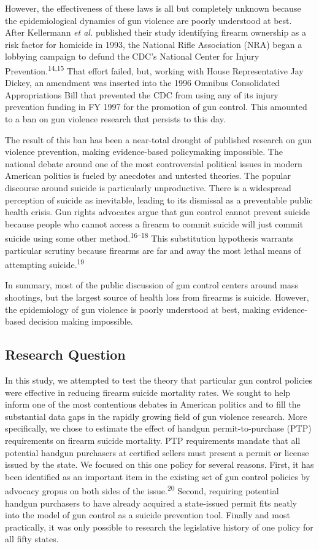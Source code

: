 \documentclass[]{article}
\begin{document}
However, the effectiveness of these laws is all but completely unknown
because the epidemiological dynamics of gun violence are poorly
understood at best. After Kellermann \emph{et al.} published their study
identifying firearm ownership as a risk factor for homicide in 1993, the
National Rifle Association (NRA) began a lobbying campaign to defund the
CDC's National Center for Injury Prevention.\textsuperscript{14,15} That
effort failed, but, working with House Representative Jay Dickey, an
amendment was inserted into the 1996 Omnibus Consolidated Appropriations
Bill that prevented the CDC from using any of its injury prevention
funding in FY 1997 for the promotion of gun control. This amounted to a
ban on gun violence research that persists to this day.

The result of this ban has been a near-total drought of published
research on gun violence prevention, making evidence-based policymaking
impossible. The national debate around one of the most controversial
political issues in modern American politics is fueled by anecdotes and
untested theories. The popular discourse around suicide is particularly
unproductive. There is a widespread perception of suicide as inevitable,
leading to its dismissal as a preventable public health crisis. Gun
rights advocates argue that gun control cannot prevent suicide because
people who cannot access a firearm to commit suicide will just commit
suicide using some other method.\textsuperscript{16--18} This
substitution hypothesis warrants particular scrutiny because firearms
are far and away the most lethal means of attempting
suicide.\textsuperscript{19}

In summary, most of the public discussion of gun control centers around
mass shootings, but the largest source of health loss from firearms is
suicide. However, the epidemiology of gun violence is poorly understood
at best, making evidence-based decision making impossible.

\subsection{Research Question}\label{research-question}

In this study, we attempted to test the theory that particular gun
control policies were effective in reducing firearm suicide mortality
rates. We sought to help inform one of the most contentious debates in
American politics and to fill the substantial data gaps in the rapidly
growing field of gun violence research. More specifically, we chose to
estimate the effect of handgun permit-to-purchase (PTP) requirements on
firearm suicide mortality. PTP requirements mandate that all potential
handgun purchasers at certified sellers must present a permit or license
issued by the state. We focused on this one policy for several reasons.
First, it has been identified as an important item in the existing set
of gun control policies by advocacy gropus on both sides of the
issue.\textsuperscript{20} Second, requiring potential handgun
purchasers to have already acquired a state-issued permit fits neatly
into the model of gun control as a suicide prevention tool. Finally and
most practically, it was only possible to research the legislative
history of one policy for all fifty states.
\end{document}
